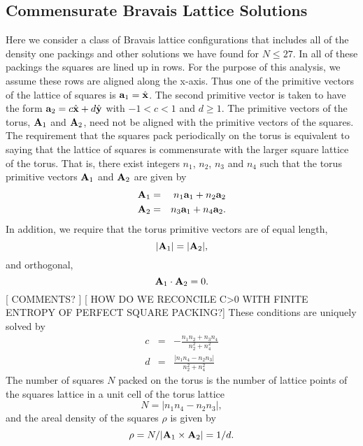 \subsection{Commensurate Bravais Lattice Solutions}
Here we consider a class of Bravais lattice configurations that includes all of the density one packings and other solutions we have found for  $N \leq 27$.   In all of these packings the squares are lined up in rows.  For the purpose of this analysis, we assume these rows are aligned along the x-axis. Thus one of the primitive vectors of the lattice of squares is ${\bf a}_1=\hat{{\bf x}}$.   The second primitive vector is taken to have the form ${\bf a}_2=c \hat{{\bf x}} + d \hat{{\bf y}}$ with $-1< c <1$ and  $d\geq 1$.  The primitive vectors of the torus, ${\bf A}_1$ and ${\bf A}_2$, need not be aligned with the primitive vectors of the squares.     The requirement that the squares pack periodically on the torus is equivalent to saying that the lattice of squares is commensurate with the larger square lattice of the torus.  That is, there exist  integers $n_1$, $n_2$, $n_3$ and $n_4$ such that the torus primitive vectors ${\bf A}_1$ and ${\bf A}_2$ are given by
\begin{eqnarray} 
\label{eqn:Ana}
{\bf A}_1&=& n_1 {\bf a}_1 + n_2 {\bf a}_2 \nonumber \\ 
{\bf A}_2&=&n_3 {\bf a}_1 + n_4 {\bf a}_2.
\end{eqnarray}
In addition, we require that the torus primitive vectors are of equal length,
\begin{equation}
\label{eqn:normal}
|{\bf A}_1|=|{\bf A}_2| ,
\end{equation}
and orthogonal,
\begin{equation}
\label{eqn:ortho}
{\bf A}_1 \cdot {\bf A}_2 = 0 .
\end{equation}
[ COMMENTS? ] [ HOW DO WE RECONCILE C>0 WITH FINITE ENTROPY OF PERFECT SQUARE PACKING?]
These conditions are uniquely solved by
\begin{eqnarray}\label{eq:gap}
c &=& - \frac{n_1 n_2 + n_3 n_4}{n_2^2 + n_4^2}\\
d &=& \frac{| n_1 n_4 - n_2 n_3|}{n_2^2 + n_4^2} \nonumber
\end{eqnarray}
The number of squares $N$ packed on the torus is the number of lattice points of the squares lattice in a unit cell of the torus lattice
\begin{equation}
\label{eqn:N}
N = |n_1 n_4 - n_2 n_3|,
\end{equation}
and the areal density of the squares $\rho$ is given by
\begin{equation}
\label{ }
\rho=N/|{\bf A}_1 \times {\bf A}_2| = 1/d.
\end{equation}

